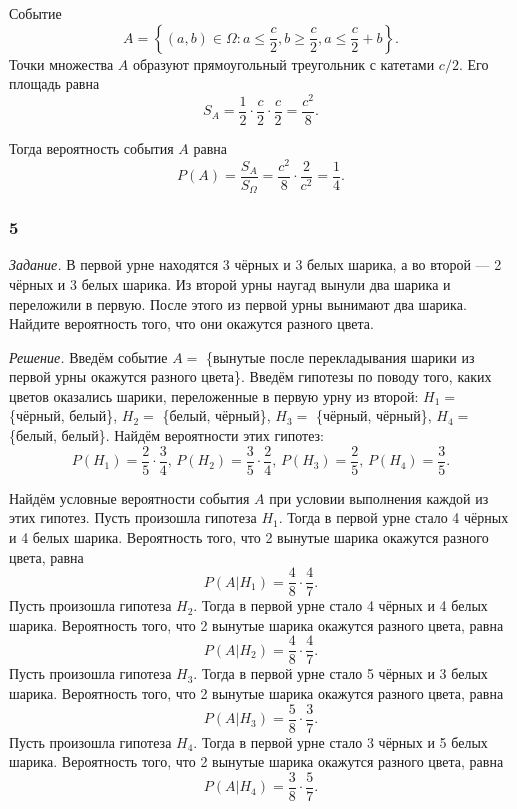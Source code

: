 Событие
$$A = \left\{ \left( a, b \right) \in \Omega: a \leq \frac{c}{2}, b \geq \frac{c}{2}, a \leq \frac{c}{2} + b \right\}.$$
Точки множества $A$ образуют прямоугольный треугольник с катетами $c/2$.
Его площадь равна
$$S_A =
\frac{1}{2} \cdot \frac{c}{2} \cdot \frac{c}{2} =
\frac{c^2}{8}.$$

Тогда вероятность события $A$ равна
$$P \left( A \right) =
\frac{S_A}{S_{ \Omega }} =
\frac{c^2}{8} \cdot \frac{2}{c^2} =
\frac{1}{4}.$$

\subsubsection*{5}

\textit{Задание.} В первой урне находятся 3 чёрных и 3 белых шарика, а во второй --- 2 чёрных и 3 белых шарика.
Из второй урны наугад вынули два шарика и переложили в первую.
После этого из первой урны вынимают два шарика.
Найдите вероятность того, что они окажутся разного цвета.

\textit{Решение.} Введём событие $A =$ \{вынутые после перекладывания шарики из первой урны окажутся разного цвета\}.
Введём гипотезы по поводу того,
каких цветов оказались шарики,
переложенные в первую урну из второй: $H_1 =$ \{чёрный, белый\}, $H_2 =$ \{белый, чёрный\}, $H_3 =$ \{чёрный, чёрный\}, $H_4 =$ \{белый, белый\}.
Найдём вероятности этих гипотез:
$$P \left( H_1 \right) =
\frac{2}{5} \cdot \frac{3}{4}, \,
P \left( H_2 \right) =
\frac{3}{5} \cdot \frac{2}{4}, \,
P \left( H_3 \right) =
\frac{2}{5}, \,
P \left( H_4 \right) =
\frac{3}{5}.$$

Найдём условные вероятности события $A$ при условии выполнения каждой из этих гипотез.
Пусть произошла гипотеза $H_1$.
Тогда в первой урне стало 4 чёрных и 4 белых шарика.
Вероятность того, что 2 вынутые шарика окажутся разного цвета, равна
$$P \left( \left. A \right| H_1 \right) =
\frac{4}{8} \cdot \frac{4}{7}.$$
Пусть произошла гипотеза $H_2$.
Тогда в первой урне стало 4 чёрных и 4 белых шарика.
Вероятность того, что 2 вынутые шарика окажутся разного цвета, равна
$$P \left( \left. A \right| H_2 \right) =
\frac{4}{8} \cdot \frac{4}{7}.$$
Пусть произошла гипотеза $H_3$.
Тогда в первой урне стало 5 чёрных и 3 белых шарика.
Вероятность того, что 2 вынутые шарика окажутся разного цвета, равна
$$P \left( \left. A \right| H_3 \right) =
\frac{5}{8} \cdot \frac{3}{7}.$$
Пусть произошла гипотеза $H_4$.
Тогда в первой урне стало 3 чёрных и 5 белых шарика.
Вероятность того, что 2 вынутые шарика окажутся разного цвета, равна
$$P \left( \left. A \right| H_4 \right) =
\frac{3}{8} \cdot \frac{5}{7}.$$

